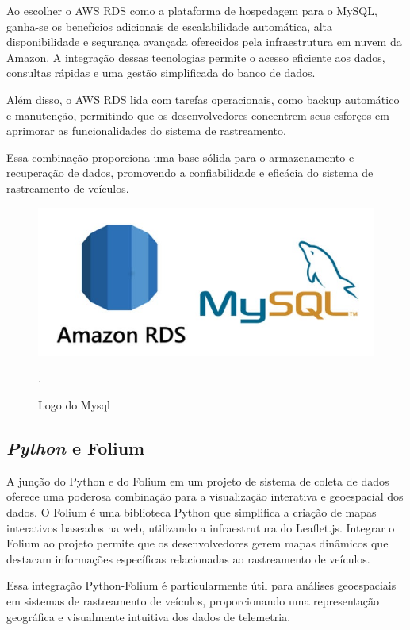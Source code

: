      Ao escolher o AWS RDS como a plataforma de hospedagem para o MySQL, ganha-se os benefícios adicionais de escalabilidade automática, alta disponibilidade e segurança avançada oferecidos pela infraestrutura em nuvem da Amazon. A integração dessas tecnologias permite o acesso eficiente aos dados, consultas rápidas e uma gestão simplificada do banco de dados. 
     
     Além disso, o AWS RDS lida com tarefas operacionais, como backup automático e manutenção, permitindo que os desenvolvedores concentrem seus esforços em aprimorar as funcionalidades do sistema de rastreamento. 
     
     Essa combinação proporciona uma base sólida para o armazenamento e recuperação de dados, promovendo a confiabilidade e eficácia do sistema de rastreamento de veículos.

      \begin{figure}[hp]
    \centering
    
    \includegraphics[scale=0.4]{figures/logo_Mysql.jpg}
    
    \caption{Logo do Mysql}.
    
\end{figure}

    
     \subsection{\textit{Python} e Folium} A junção do Python e do Folium em um projeto de sistema de coleta de dados oferece uma poderosa combinação para a visualização interativa e geoespacial dos dados. O Folium é uma biblioteca Python que simplifica a criação de mapas interativos baseados na web, utilizando a infraestrutura do Leaflet.js. Integrar o Folium ao projeto permite que os desenvolvedores gerem mapas dinâmicos que destacam informações específicas relacionadas ao rastreamento de veículos.

    Essa integração Python-Folium é particularmente útil para análises geoespaciais em sistemas de rastreamento de veículos, proporcionando uma representação geográfica e visualmente intuitiva dos dados de telemetria. 
    

